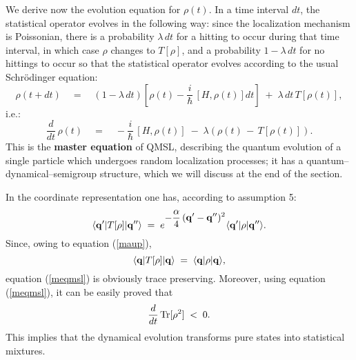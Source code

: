 \documentclass[10pt,a4paper]{article}
\begin{document}
We  derive now the evolution equation for $\rho(t)$. In a time
interval $dt$, the statistical operator evolves in the following
way: since the localization mechanism is Poissonian, there is a
probability $\lambda\,dt$ for a hitting to occur during that time
interval, in which case $\rho$ changes to $T[\rho]$, and a
probability $1 - \lambda\,dt$ for no hittings to occur so that the
statistical operator evolves according to the usual Schr\"odinger
equation:
\[
\rho (t + dt) \quad = \quad (1 - \lambda\,dt) \left[ \rho(t) -
\frac{i}{\hbar}\, [H, \rho(t)] dt\right] \; + \; \lambda\, dt\,
T[\rho(t)],
\]
i.e.:
\begin{equation} \label{meqmsl}
\frac{d}{dt}\, \rho(t) \quad = \quad -\frac{i}{\hbar}\, [H,
\rho(t)] \; - \; \lambda\left(\rho(t)\, - \, T[\rho(t)] \right).
\end{equation}
This is the {\bf master equation} of QMSL, describing the quantum
evolution of a single particle which undergoes random localization
processes; it has a quantum--dynamical--semigroup structure, which
we will discuss at the end of the section.

In the coordinate representation one has, according to assumption
5:
\begin{equation} \label{maup}
\langle{\bf q}'|T[\rho]|{\bf q}''\rangle \; = \; e^{\displaystyle
-\frac{\alpha}{4}\, ({\bf q}' - {\bf q}'')^{2}} \langle{\bf
q}'|\rho|{\bf q}''\rangle.
\end{equation}
Since, owing to equation (\ref{maup}),
\begin{equation}
\langle{\bf q}|T[\rho]|{\bf q}\rangle \; = \; \langle{\bf
q}|\rho|{\bf q}\rangle,
\end{equation}
equation (\ref{meqmsl}) is obviously trace preserving. Moreover,
using equation (\ref{meqmsl}), it can be easily proved that
\begin{equation}
\frac{d}{dt}\, \makebox{Tr}[\rho^{2}] \; < \; 0.
\end{equation}
This implies that the dynamical evolution transforms pure states
into statistical mixtures.
\end{document}
